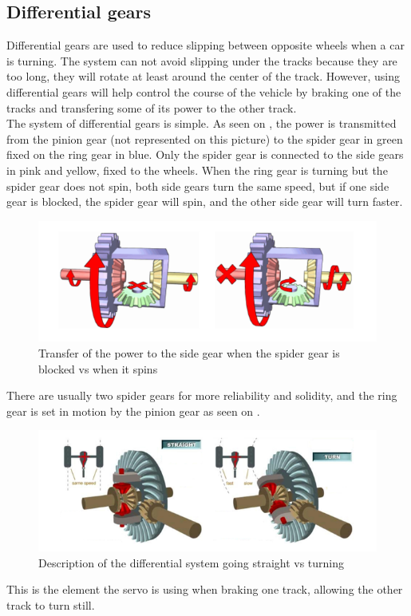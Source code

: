 \subsection{Differential gears}

Differential gears are used to reduce slipping between opposite wheels when a car is turning. The system can not avoid slipping under the tracks because they are too long, they will rotate at least around the center of the track. However, using differential gears will help control the course of the vehicle by braking one of the tracks and transfering some of its power to the other track.\\

The system of differential gears is simple. As seen on , the power is transmitted from the pinion gear (not represented on this picture) to the spider gear in green fixed on the ring gear in blue. Only the spider gear is connected to the side gears in pink and yellow, fixed to the wheels.
When the ring gear is turning but the spider gear does not spin, both side gears turn the same speed, but if one side gear is blocked, the spider gear will spin,  and the other side gear will turn faster.\\

\begin{figure}[H]
	\centering
	\includegraphics[scale=0.7]{figures/diffGearLight}
	\caption{Transfer of the power to the side gear when the spider gear is blocked vs when it spins \cite{MechanicalEngineering}}
	\label{diffGearLight}
\end{figure}

There are usually two spider gears for more reliability and solidity, and the ring gear is set in motion by the pinion gear as seen on .\\

\begin{figure}[H]
	\centering
	\includegraphics[scale=0.7]{figures/diffGearFull}
	\caption{Description of the differential system going straight vs turning \cite{MechanicalEngineering}}
	\label{diffGearFull}
\end{figure}

This is the element the servo is using when braking one track, allowing the other track to turn still.\\